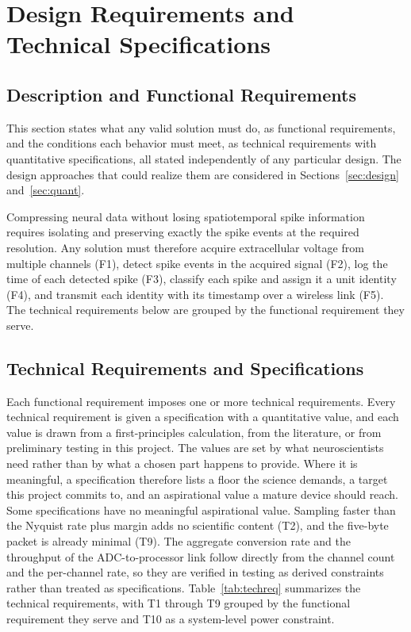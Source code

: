 \documentclass[11pt]{article}
\begin{document}
\section{Design Requirements and Technical Specifications}

\subsection{Description and Functional Requirements}
This section states what any valid solution must do, as functional requirements, and the
conditions each behavior must meet, as technical requirements with quantitative
specifications, all stated independently of any particular design. The design approaches
that could realize them are considered in Sections~\ref{sec:design} and~\ref{sec:quant}.

Compressing neural data without losing spatiotemporal spike information requires isolating
and preserving exactly the spike events at the required resolution. Any solution must
therefore acquire extracellular voltage from multiple channels (F1), detect spike events in
the acquired signal (F2), log the time of each detected spike (F3), classify each spike and
assign it a unit identity (F4), and transmit each identity with its timestamp over a wireless
link (F5). The technical requirements below are grouped by the functional requirement they
serve.


\subsection{Technical Requirements and Specifications}
Each functional requirement imposes one or more technical requirements. Every technical
requirement is given a specification with a quantitative value, and each value is drawn
from a first-principles calculation, from the literature, or from preliminary testing in
this project. The values are set by what neuroscientists need rather than by what a
chosen part happens to provide. Where it is meaningful, a specification therefore lists a
floor the science demands, a target this project commits to, and an aspirational value a
mature device should reach. Some specifications have no meaningful aspirational value.
Sampling faster than the Nyquist rate plus margin adds no scientific content (T2), and the
five-byte packet is already minimal (T9). The aggregate conversion rate and the throughput of the
ADC-to-processor link follow directly from the channel count and the per-channel rate, so
they are verified in testing as derived constraints rather than treated as
specifications. Table~\ref{tab:techreq} summarizes the technical requirements, with T1 through T9 grouped
by the functional requirement they serve and T10 as a system-level power constraint.
\end{document}
